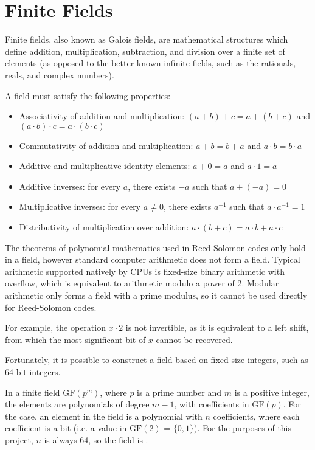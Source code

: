 \section{Finite Fields}

Finite fields, also known as Galois fields, are mathematical structures which define addition, multiplication, subtraction, and division over a finite set of elements \cite{finite-fields-2nd-ed}
(as opposed to the better-known infinite fields, such as the rationals, reals, and complex numbers).

A field must satisfy the following properties:

\begin{itemize}[nosep]
    \item Associativity of addition and multiplication: $(a + b) + c = a + (b + c)$ and $(a \cdot b) \cdot c = a \cdot (b \cdot c)$
    \item Commutativity of addition and multiplication: $a + b = b + a$ and $a \cdot b = b \cdot a$
    \item Additive and multiplicative identity elements: $a + 0 = a$ and $a \cdot 1 = a$
    \item Additive inverses: for every $a$, there exists $-a$ such that $a + (-a) = 0$
    \item Multiplicative inverses: for every $a \neq 0$, there exists $a^{-1}$ such that $a \cdot a^{-1} = 1$
    \item Distributivity of multiplication over addition: $a \cdot (b + c) = a \cdot b + a \cdot c$
\end{itemize}

The theorems of polynomial mathematics used in Reed-Solomon codes only hold in a field, however standard computer arithmetic does not form a field.
Typical arithmetic supported natively by CPUs is fixed-size binary arithmetic with overflow, which is equivalent to arithmetic modulo a power of 2.
Modular arithmetic only forms a field with a prime modulus, so it cannot be used directly for Reed-Solomon codes.

For example, the operation $x \cdot 2$ is not invertible, as it is equivalent to a left shift, from which the most significant bit of $x$ cannot be recovered.

Fortunately, it is possible to construct a field based on fixed-size integers, such as 64-bit integers.

In a finite field $\text{GF}(p^m)$, where $p$ is a prime number and $m$ is a positive integer, the elements are polynomials of degree $m - 1$, with coefficients in $\text{GF}(p)$.
For the  case, an element in the field is a polynomial with $n$ coefficients, where each coefficient is a bit (i.e. a value in $\text{GF}(2)$ = $\{0, 1\}$).
For the purposes of this project, $n$ is always 64, so the field is .

